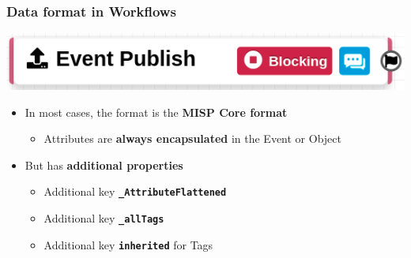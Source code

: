 \begin{frame}
    \frametitle{Data format in Workflows}
    \begin{center}
        \includegraphics[width=0.7\linewidth]{pictures/workflow-trigger.png}
    \end{center}
    \begin{itemize}
        \item In most cases, the format is the \textbf{MISP Core format}
        \begin{itemize}
            \item Attributes are \textbf{always encapsulated} in the Event or Object
        \end{itemize}
        \item But has \textbf{additional properties}
        \begin{itemize}
            \item Additional key \textbf{\texttt{\_AttributeFlattened}}
            \item Additional key \textbf{\texttt{\_allTags}}
            \item Additional key \textbf{\texttt{inherited}} for Tags
        \end{itemize}
    \end{itemize}
\end{frame}

